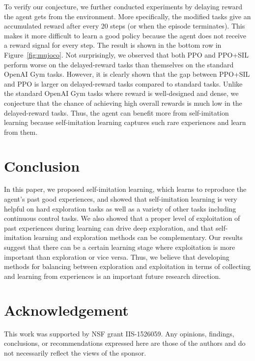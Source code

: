\documentclass{article}
\newcommand{\cutsectionup}{\vspace*{-0.08in}}\newcommand{\cutsectiondown}{\vspace*{-0.05in}}
\begin{document}
To verify our conjecture, we further conducted experiments by delaying reward the agent gets from the environment. More specifically, the modified tasks give an accumulated reward after every 20 steps (or when the episode terminates). This makes it more difficult to learn a good policy because the agent does not receive a reward signal for every step. 
The result is shown in the bottom row in Figure~\ref{fig:mujoco}. Not surprisingly, we observed that both PPO and PPO+SIL perform worse on the delayed-reward tasks than themselves on the standard OpenAI Gym tasks. However, it is clearly shown that the gap between PPO+SIL and PPO is larger on delayed-reward tasks compared to standard tasks. Unlike the standard OpenAI Gym tasks where reward is well-designed and dense, we conjecture that the chance of achieving high overall rewards is much low in the delayed-reward tasks. Thus, the agent can benefit more from self-imitation learning because self-imitation learning captures such rare experiences and learn from them. 

\cutsectionup
\section{Conclusion}
\cutsectiondown
In this paper, we proposed self-imitation learning, which learns to reproduce the agent's past good experiences, and showed that self-imitation learning is very helpful on hard exploration tasks as well as a variety of other tasks including continuous control tasks. 
We also showed that a proper level of exploitation of past experiences during learning can drive deep exploration, and that self-imitation learning and exploration methods can be complementary.
Our results suggest that there can be a certain learning stage where exploitation is more important than exploration or vice versa. 
Thus, we believe that developing methods for balancing between exploration and exploitation in terms of collecting and learning from experiences is an important future research direction. 

\clearpage
\section*{Acknowledgement} 
This work was supported by NSF grant IIS-1526059. Any opinions, findings, conclusions, or recommendations expressed here are those of the authors and do not necessarily reflect the views of the sponsor.



\clearpage
\onecolumn
\appendix
\end{document}

